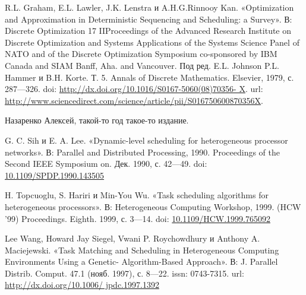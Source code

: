 \begin{thebibliography}{9}	
\large

 R.L. Graham, E.L. Lawler, J.K. Lenstra и A.H.G.Rinnooy Kan. «Optimization and Approximation in Deterministic Sequencing and Scheduling: a Survey». В: Discrete Optimization
17
IIProceedings of the Advanced Research Institute on Discrete Optimization and Systems Applications of the Systems Science Panel of NATO and of the Discrete Optimization Symposium co-sponsored by IBM Canada and SIAM Banff, Aha. and Vancouver. Под ред. E.L. Johnson P.L. Hammer и B.H. Korte. Т. 5. Annals of Discrete Mathematics. Elsevier, 1979, с. 287—326. doi: \url{http://dx.doi.org/10.1016/S0167-5060(08)70356- X}. url: \url{http://www.sciencedirect.com/science/article/pii/S016750600870356X}.

 Назаренко Алексей, такой-то год такое-то издание.

 G. C. Sih и E. A. Lee. «Dynamic-level scheduling for heterogeneous processor networks». В: Parallel and Distributed Processing, 1990. Proceedings of the Second IEEE Symposium on. Дек. 1990, с. 42—49. doi: \href{http://ieeexplore.ieee.org/document/143505/}{10.1109/SPDP.1990.143505}


 H. Topcuoglu, S. Hariri и Min-You Wu. «Task scheduling algorithms for heterogeneous processors». В: Heterogeneous Computing Workshop, 1999. (HCW ’99) Proceedings. Eighth. 1999, с. 3—14. doi: \href{http://ieeexplore.ieee.org/document/765092/}{10.1109/HCW.1999.765092}

 Lee Wang, Howard Jay Siegel, Vwani P. Roychowdhury и Anthony A. Maciejewski. «Task Matching and Scheduling in Heterogeneous Computing Environments Using a Genetic- Algorithm-Based Approach». В: J. Parallel Distrib. Comput. 47.1 (нояб. 1997), с. 8—22. issn: 0743-7315. url: \url{http://dx.doi.org/10.1006/ jpdc.1997.1392}


\end{thebibliography}